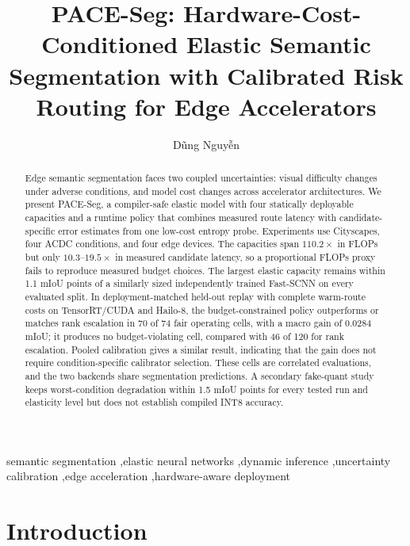 \documentclass[a4paper,review,12pt]{elsarticle}
\newcommand{\method}{PACE-Seg}
\newcommand{\miou}{mIoU}
\begin{document}
\begin{frontmatter}

\title{PACE-Seg: Hardware-Cost-Conditioned Elastic Semantic Segmentation with Calibrated Risk Routing for Edge Accelerators}

\author{D\~{u}ng Nguy\~{\^{e}}n}

\begin{abstract}
Edge semantic segmentation faces two coupled uncertainties: visual difficulty changes under adverse conditions, and model cost changes across accelerator architectures. We present \method, a compiler-safe elastic model with four statically deployable capacities and a runtime policy that combines measured route latency with candidate-specific error estimates from one low-cost entropy probe. Experiments use Cityscapes, four ACDC conditions, and four edge devices. The capacities span $110.2\times$ in FLOPs but only $10.3$--$19.5\times$ in measured candidate latency, so a proportional FLOPs proxy fails to reproduce measured budget choices. The largest elastic capacity remains within 1.1 \miou{} points of a similarly sized independently trained Fast-SCNN on every evaluated split. In deployment-matched held-out replay with complete warm-route costs on TensorRT/CUDA and Hailo-8, the budget-constrained policy outperforms or matches rank escalation in 70 of 74 fair operating cells, with a macro gain of 0.0284 \miou{}; it produces no budget-violating cell, compared with 46 of 120 for rank escalation. Pooled calibration gives a similar result, indicating that the gain does not require condition-specific calibrator selection. These cells are correlated evaluations, and the two backends share segmentation predictions. A secondary fake-quant study keeps worst-condition degradation within 1.5 \miou{} points for every tested run and elasticity level but does not establish compiled INT8 accuracy.
\end{abstract}

\begin{keyword}
semantic segmentation \sep elastic neural networks \sep dynamic inference \sep uncertainty calibration \sep edge acceleration \sep hardware-aware deployment
\end{keyword}

\end{frontmatter}

\section{Introduction}
\label{sec:introduction}
\end{document}
